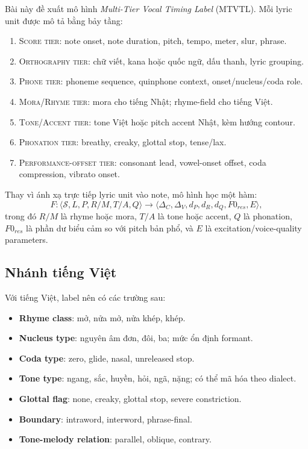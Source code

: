 \documentclass[12pt,a4paper]{article}
\newcommand{\term}[1]{\textit{#1}}
\newcommand{\tier}[1]{\textsc{#1}}
\newcommand{\score}{\mathcal{S}}
\newcommand{\offset}{\Delta}
\begin{document}
Bài này đề xuất mô hình 
\term{Multi-Tier Vocal Timing Label} (MTVTL). Mỗi lyric unit được mô tả bằng bảy tầng:

\begin{enumerate}
  \item \tier{Score tier}: note onset, note duration, pitch, tempo, meter, slur, phrase.
  \item \tier{Orthography tier}: chữ viết, kana hoặc quốc ngữ, dấu thanh, lyric grouping.
  \item \tier{Phone tier}: phoneme sequence, quinphone context, onset/nucleus/coda role.
  \item \tier{Mora/Rhyme tier}: mora cho tiếng Nhật; rhyme-field cho tiếng Việt.
  \item \tier{Tone/Accent tier}: tone Việt hoặc pitch accent Nhật, kèm hướng contour.
  \item \tier{Phonation tier}: breathy, creaky, glottal stop, tense/lax.
  \item \tier{Performance-offset tier}: consonant lead, vowel-onset offset, coda compression, vibrato onset.
\end{enumerate}

Thay vì ánh xạ trực tiếp lyric unit vào note, mô hình học một hàm:
\[
F: \langle \score, L, P, R/M, T/A, Q \rangle \rightarrow \langle \offset_C, \offset_V, d_P, d_R, d_Q, F0_{res}, E \rangle,
\]
trong đó $R/M$ là rhyme hoặc mora, $T/A$ là tone hoặc accent, $Q$ là phonation, $F0_{res}$ là phần dư biểu cảm so với pitch bản phổ, và $E$ là excitation/voice-quality parameters.

\subsection{Nhánh tiếng Việt}

Với tiếng Việt, label nên có các trường sau:

\begin{itemize}
  \item \textbf{Rhyme class}: mở, nửa mở, nửa khép, khép.
  \item \textbf{Nucleus type}: nguyên âm đơn, đôi, ba; mức ổn định formant.
  \item \textbf{Coda type}: zero, glide, nasal, unreleased stop.
  \item \textbf{Tone type}: ngang, sắc, huyền, hỏi, ngã, nặng; có thể mã hóa theo dialect.
  \item \textbf{Glottal flag}: none, creaky, glottal stop, severe constriction.
  \item \textbf{Boundary}: intraword, interword, phrase-final.
  \item \textbf{Tone-melody relation}: parallel, oblique, contrary.
\end{itemize}
\end{document}
